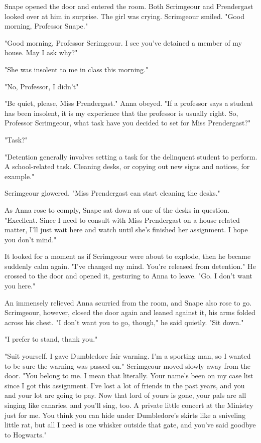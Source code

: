 Snape opened the door and entered the room. Both Scrimgeour and Prendergast looked over at him in surprise. The girl was crying. Scrimgeour smiled. "Good morning, Professor Snape."

"Good morning, Professor Scrimgeour. I see you've detained a member of my house. May I ask why?"

"She was insolent to me in class this morning."

"No, Professor, I didn't{\el}"

"Be quiet, please, Miss Prendergast." Anna obeyed. "If a professor says a student has been insolent, it is my experience that the professor is usually right. So, Professor Scrimgeour, what task have you decided to set for Miss Prendergast?"

"Task?"

"Detention generally involves setting a task for the delinquent student to perform. A school-related task. Cleaning desks, or copying out new signs and notices, for example."

Scrimgeour glowered. "Miss Prendergast can start cleaning the desks."

As Anna rose to comply, Snape sat down at one of the desks in question. "Excellent. Since I need to consult with Miss Prendergast on a house-related matter, I'll just wait here and watch until she's finished her assignment. I hope you don't mind."

It looked for a moment as if Scrimgeour were about to explode, then he became suddenly calm again. "I've changed my mind. You're released from detention." He crossed to the door and opened it, gesturing to Anna to leave. "Go. I don't want you here."

An immensely relieved Anna scurried from the room, and Snape also rose to go. Scrimgeour, however, closed the door again and leaned against it, his arms folded across his chest. "I don't want you to go, though," he said quietly. "Sit down."

"I prefer to stand, thank you."

"Suit yourself. I gave Dumbledore fair warning. I'm a sporting man, so I wanted to be sure the warning was passed on." Scrimgeour moved slowly away from the door. "You belong to me. I mean that literally. Your name's been on my case list since I got this assignment. I've lost a lot of friends in the past years, and you and your lot are going to pay. Now that lord of yours is gone, your pals are all singing like canaries, and you'll sing, too. A private little concert at the Ministry just for me. You think you can hide under Dumbledore's skirts like a sniveling little rat, but all I need is one whisker outside that gate, and you've said goodbye to Hogwarts."

